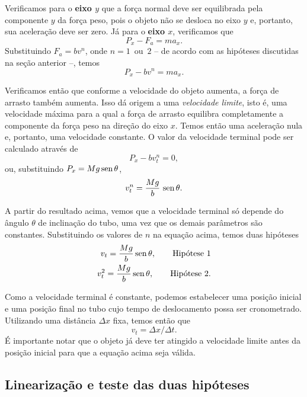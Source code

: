 Verificamos para o \textbf{eixo $y$} que a força normal deve ser equilibrada pela componente $y$ da força peso, pois o objeto não se desloca no eixo $y$ e, portanto, sua aceleração deve ser zero. Já para o \textbf{eixo $x$}, verificamos que
\begin{equation}
	P_x - F_a = ma_x.
\end{equation}
%
Substituindo $F_a = bv^{n}$, onde $n=1$~ou~$2$ -- de acordo com as hipóteses discutidas na seção anterior --, temos
\begin{equation}
	P_x - bv^n = ma_x.
\end{equation}

Verificamos então que conforme a velocidade do objeto aumenta, a força de arrasto também aumenta. Isso dá origem a uma \emph{velocidade limite}, isto é, uma velocidade máxima para a qual a força de arrasto equilibra completamente a componente da força peso na direção do eixo $x$. Temos então uma aceleração nula e, portanto, uma velocidade constante. O valor da velocidade terminal pode ser calculado através de
\begin{equation}
	P_x - bv_t^n = 0,
\end{equation}
%
ou, substituindo $P_x = Mg\operatorname{sen}\theta$,
\begin{equation}
	v_t^n = \frac{Mg}{b}\,\operatorname{sen}\theta.
\end{equation}

A partir do resultado acima, vemos que a velocidade terminal só depende do ângulo $\theta$ de inclinação do tubo, uma vez que os demais parâmetros são constantes. Substituindo os valores de $n$ na equação acima, temos duas hipóteses
\begin{align}
	v_t =\frac{Mg}{b}\operatorname{sen}\theta, \qquad\textrm{Hipótese 1} \\
	v_t^2 =\frac{Mg}{b}\operatorname{sen}\theta, \qquad\textrm{Hipótese 2.}
\end{align}

Como a velocidade terminal é constante, podemos estabelecer uma posição inicial e uma posição final no tubo cujo tempo de deslocamento possa ser cronometrado. Utilizando uma distância $\Delta x$ fixa, temos então que
\begin{equation}
	v_t = \Delta x / \Delta t.
\end{equation}
%
É importante notar que o objeto já deve ter atingido a velocidade limite antes da posição inicial para que a equação acima seja válida.

\subsection{Linearização e teste das duas hipóteses}

